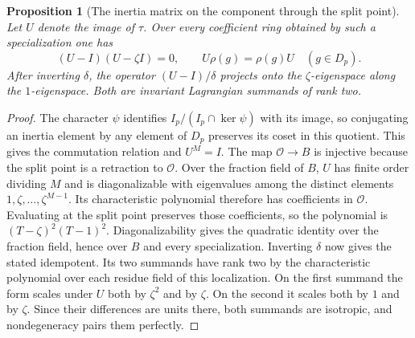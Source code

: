\documentclass[a4paper,11pt]{article}
\newtheorem{proposition}{Proposition}[section]
\theoremstyle{definition}
\theoremstyle{remark}
\numberwithin{equation}{section}
\begin{document}
\begin{proposition}[The inertia matrix on the component through the split point]
\leavevmode\label{prop:conductorinertia655}
Let \(U\) denote the image of \(\tau\). Over every coefficient ring
obtained by such a specialization one has
\[
   (U-I)(U-\zeta I)=0,\qquad U\rho(g)=\rho(g)U
                  \quad(g\in D_p).
\]
After inverting \(\delta\), the operator \((U-I)/\delta\) projects
onto the \(\zeta\)-eigenspace along the \(1\)-eigenspace.
Both are invariant Lagrangian summands of rank two.
\end{proposition}
\begin{proof}
The character \(\psi\) identifies \(I_p/(I_p\cap\ker\psi)\)
with its image, so conjugating an inertia element by any element
of \(D_p\) preserves its coset in this quotient. This gives the
commutation relation and \(U^M=I\). The map \(\mathcal O\to B\)
is injective because the split point is a retraction to \(\mathcal O\).
Over the fraction field of \(B\), \(U\) has finite order dividing
\(M\) and is diagonalizable with eigenvalues among the distinct
elements \(1,\zeta,\ldots,\zeta^{M-1}\). Its characteristic
polynomial therefore has coefficients in \(\mathcal O\).
Evaluating at the split point preserves those coefficients, so the
polynomial is \((T-\zeta)^2(T-1)^2\). Diagonalizability gives the
quadratic identity over the fraction field, hence over \(B\) and
every specialization. Inverting \(\delta\) now gives the stated
idempotent. Its two summands have rank two by the characteristic
polynomial over each residue field of this localization. On the
first summand the form scales under \(U\) both by \(\zeta^2\) and
by \(\zeta\). On the second it scales both by \(1\) and by
\(\zeta\). Since their differences are units there, both summands
are isotropic, and nondegeneracy pairs them perfectly.
\end{proof}
\end{document}
